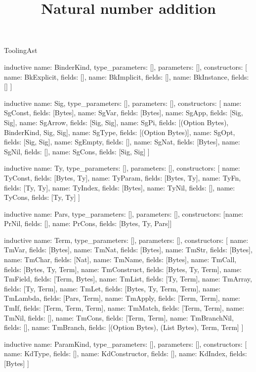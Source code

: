\begin{lexlean}{ToolingAst}
\title{Natural number addition}
\begin{semanticmodule}
inductive{
  name: BinderKind,
  type_parameters: [],
  parameters: [],
  constructors: [
    {name: BkExplicit, fields: []},
    {name: BkImplicit, fields: []},
    {name: BkInstance, fields: []}
  ]
}

inductive{
  name: Sig,
  type_parameters: [],
  parameters: [],
  constructors: [
    {name: SgConst, fields: [Bytes]},
    {name: SgVar, fields: [Bytes]},
    {name: SgApp, fields: [Sig, Sig]},
    {name: SgArrow, fields: [Sig, Sig]},
    {name: SgPi, fields: [(Option Bytes), BinderKind, Sig, Sig]},
    {name: SgType, fields: [(Option Bytes)]},
    {name: SgOpt, fields: [Sig, Sig]},
    {name: SgEmpty, fields: []},
    {name: SgNat, fields: [Bytes]},
    {name: SgNil, fields: []},
    {name: SgCons, fields: [Sig, Sig]}
  ]
}

inductive{
  name: Ty,
  type_parameters: [],
  parameters: [],
  constructors: [
    {name: TyConst, fields: [Bytes, Ty]},
    {name: TyParam, fields: [Bytes, Ty]},
    {name: TyFn, fields: [Ty, Ty]},
    {name: TyIndex, fields: [Bytes]},
    {name: TyNil, fields: []},
    {name: TyCons, fields: [Ty, Ty]}
  ]
}

inductive{
  name: Pars,
  type_parameters: [],
  parameters: [],
  constructors: [{name: PrNil, fields: []}, {name: PrCons, fields: [Bytes, Ty, Pars]}]
}

inductive{
  name: Term,
  type_parameters: [],
  parameters: [],
  constructors: [
    {name: TmVar, fields: [Bytes]},
    {name: TmNat, fields: [Bytes]},
    {name: TmStr, fields: [Bytes]},
    {name: TmChar, fields: [Nat]},
    {name: TmName, fields: [Bytes]},
    {name: TmCall, fields: [Bytes, Ty, Term]},
    {name: TmConstruct, fields: [Bytes, Ty, Term]},
    {name: TmField, fields: [Term, Bytes]},
    {name: TmList, fields: [Ty, Term]},
    {name: TmArray, fields: [Ty, Term]},
    {name: TmLet, fields: [Bytes, Ty, Term, Term]},
    {name: TmLambda, fields: [Pars, Term]},
    {name: TmApply, fields: [Term, Term]},
    {name: TmIf, fields: [Term, Term, Term]},
    {name: TmMatch, fields: [Term, Term]},
    {name: TmNil, fields: []},
    {name: TmCons, fields: [Term, Term]},
    {name: TmBranchNil, fields: []},
    {name: TmBranch, fields: [(Option Bytes), (List Bytes), Term, Term]}
  ]
}

inductive{
  name: ParamKind,
  type_parameters: [],
  parameters: [],
  constructors: [
    {name: KdType, fields: []},
    {name: KdConstructor, fields: []},
    {name: KdIndex, fields: [Bytes]}
  ]
}


\end{semanticmodule}
\end{lexlean}
